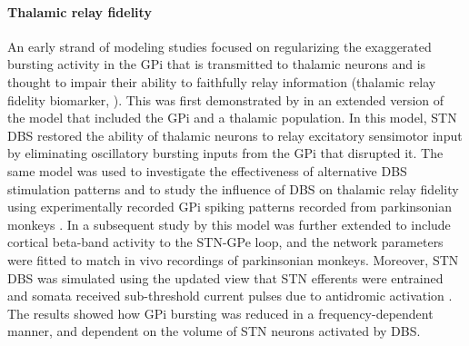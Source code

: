 \paragraph{Thalamic relay fidelity}
An early strand of modeling studies focused on regularizing the exaggerated bursting activity
in the GPi that is transmitted to thalamic neurons and is thought to impair their
ability to faithfully relay information (thalamic relay fidelity biomarker, \cite{rubin_high_2004,feng_optimal_2007,guo_thalamocortical_2008,pirini_computational_2009,hahn_modeling_2010,guo_multi-site_2011}).
This was first demonstrated by \cite{rubin_high_2004} in an extended version of the
\cite{terman_activity_2002} model that included the GPi and a thalamic population.
In this model, STN DBS restored the ability of thalamic neurons to relay excitatory
sensimotor input by eliminating oscillatory bursting inputs from the GPi that disrupted it.
The same model was used to investigate the effectiveness of alternative
DBS stimulation patterns \cite{feng_optimal_2007} and to study the influence
of DBS on thalamic relay fidelity using experimentally recorded GPi spiking patterns
recorded from parkinsonian monkeys \cite{guo_thalamocortical_2008}.
%
In a subsequent study by \cite{hahn_modeling_2010} this model was further
extended to include cortical beta-band activity to the STN-GPe loop, and the network
parameters were fitted to match in vivo recordings of parkinsonian monkeys.
Moreover, STN DBS was simulated using the updated view that STN efferents were entrained
and somata received sub-threshold current pulses due to antidromic activation \cite{miocinovic_computational_2006}.
The results showed how GPi bursting was reduced in a frequency-dependent manner, and
dependent on the volume of STN neurons activated by DBS.

%
